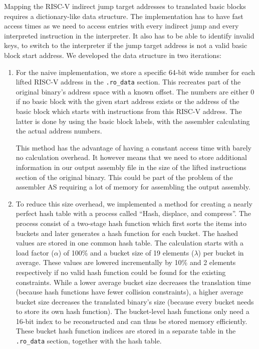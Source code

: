 \documentclass[course=eragp]{aspdoc}
\begin{document}
\par 

Mapping the RISC-V indirect jump target addresses to translated basic blocks requires a
dictionary-like data structure.
The implementation has to have fast access times as we need to access entries with
every indirect jump and every interpreted instruction in the interpreter. It also has to be able
to identify invalid keys, to switch to the interpreter if the
jump target address is not a valid basic block start address. We developed the data structure in two
iterations:

\begin{enumerate}
\item For the naive implementation, we store a specific 64-bit wide number for each lifted RISC-V address
in the \texttt{.ro\_data} section. This recreates part of the original binary's address
space with a known offset. The numbers are either 0 if no basic block with the given start address
exists or the address of the basic block which starts with instructions from this RISC-V address.
The latter is done by using the basic block labels, with the assembler calculating the actual
address numbers.
\par
This method has the advantage of having a constant access time with barely no calculation overhead. It
however means that we need to store additional information in our output assembly file in the size of the
lifted instructions section of the original binary. This could be part of the problem of the
assembler AS requiring a lot of memory for assembling the output assembly.

\item To reduce this size overhead, we implemented a method for creating a nearly perfect hash table with a
process called ``Hash, displace, and compress''\cite{CHD}. The process consist of a two-stage hash
function which first sorts the items into buckets and later generates a hash function for each
bucket. The hashed values are stored in one common hash table. The calculation starts with a load
factor ($\alpha$) of 100\% and a bucket size of 19 elements ($\lambda$) per bucket in average. These values are lowered
incrementally by 10\% and 2 elements respectively if no valid hash function could be found for the
existing constraints.
While a lower average bucket size decreases the translation time (because hash functions have fewer
collision constraints), a higher average bucket size decreases the translated binary's size (because
every bucket needs to store its own hash function).
The bucket-level hash functions only need a 16-bit index to be reconstructed and can
thus
be stored memory efficiently. These bucket hash function indices are stored in a separate table in
the \texttt{.ro\_data} section, together with the hash table.


\end{enumerate}
\end{document}
